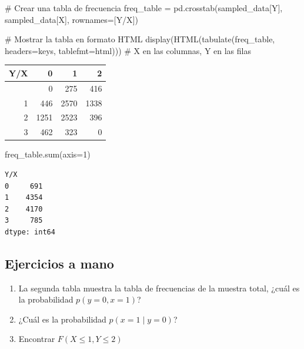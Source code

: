 \documentclass[
  letterpaper,
  DIV=11,
  numbers=noendperiod]{scrartcl}
\newenvironment{Shaded}{\begin{snugshade}}{\end{snugshade}}
\newcommand{\BuiltInTok}[1]{\textcolor[rgb]{0.00,0.23,0.31}{#1}}
\newcommand{\CommentTok}[1]{\textcolor[rgb]{0.37,0.37,0.37}{#1}}
\newcommand{\DecValTok}[1]{\textcolor[rgb]{0.68,0.00,0.00}{#1}}
\newcommand{\NormalTok}[1]{\textcolor[rgb]{0.00,0.23,0.31}{#1}}
\newcommand{\OperatorTok}[1]{\textcolor[rgb]{0.37,0.37,0.37}{#1}}
\newcommand{\StringTok}[1]{\textcolor[rgb]{0.13,0.47,0.30}{#1}}
\providecommand{\tightlist}{%
  \setlength{\itemsep}{0pt}\setlength{\parskip}{0pt}}\usepackage{longtable,booktabs,array}
\begin{document}
\begin{Shaded}
\begin{Highlighting}[]
\CommentTok{\# Crear una tabla de frecuencia}
\NormalTok{freq\_table }\OperatorTok{=}\NormalTok{ pd.crosstab(sampled\_data[}\StringTok{\textquotesingle{}Y\textquotesingle{}}\NormalTok{], sampled\_data[}\StringTok{\textquotesingle{}X\textquotesingle{}}\NormalTok{], rownames}\OperatorTok{=}\NormalTok{[}\StringTok{\textquotesingle{}Y/X\textquotesingle{}}\NormalTok{])}

\CommentTok{\# Mostrar la tabla en formato HTML}
\NormalTok{display(HTML(tabulate(freq\_table, headers}\OperatorTok{=}\StringTok{\textquotesingle{}keys\textquotesingle{}}\NormalTok{, tablefmt}\OperatorTok{=}\StringTok{\textquotesingle{}html\textquotesingle{}}\NormalTok{)))}
\CommentTok{\# X en las columnas, Y en las filas}
\end{Highlighting}
\end{Shaded}

\begin{longtable}[]{@{}rrrr@{}}
\toprule\noalign{}
Y/X & 0 & 1 & 2 \\
\midrule\noalign{}
\endhead
\bottomrule\noalign{}
\endlastfoot
0 & 0 & 275 & 416 \\
1 & 446 & 2570 & 1338 \\
2 & 1251 & 2523 & 396 \\
3 & 462 & 323 & 0 \\
\end{longtable}

\begin{Shaded}
\begin{Highlighting}[]
\NormalTok{freq\_table.}\BuiltInTok{sum}\NormalTok{(axis}\OperatorTok{=}\DecValTok{1}\NormalTok{)}
\end{Highlighting}
\end{Shaded}

\begin{verbatim}
Y/X
0     691
1    4354
2    4170
3     785
dtype: int64
\end{verbatim}

\hypertarget{ejercicios-a-mano}{%
\subsection{Ejercicios a mano}\label{ejercicios-a-mano}}

\begin{enumerate}
\def\labelenumi{\arabic{enumi}.}
\tightlist
\item
  La segunda tabla muestra la tabla de frecuencias de la muestra total,
  ¿cuál es la probabilidad \(p(y=0, x=1)\)?
\item
  ¿Cuál es la probabilidad \(p(x=1 \mid y=0)\)?
\item
  Encontrar \(F(X\leq 1,Y\leq 2)\)
\end{enumerate}
\end{document}
